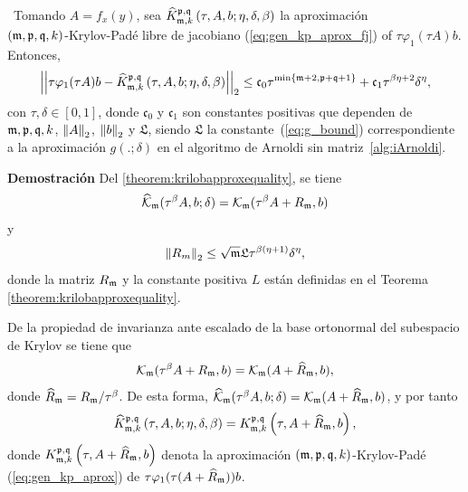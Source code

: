 \begin{theorem}\label{theorem:Krylov-fj-bound}
\cite{naranjo2023jacobian}~Tomando $A=f_x(y)$, sea $\widehat{K}_{\mathfrak{m},k}^{\mathfrak{p},\mathfrak{q}}\left(\tau, A , b ; \eta, \delta, \beta \right)$ la aproximación \\
	$(\mathfrak{m} , \mathfrak{p} ,\mathfrak{q} , k)$-Krylov-Padé libre de jacobiano (\ref{eq:gen_kp_aprox_fj}) of $\tau \varphi_1(\tau A)b$. Entonces,
	\begin{equation}
		\left\lvert\left\lvert  \tau \varphi_1(\tau A)b -
		\widehat{K}_{\mf,k}^{\pf,\qf}\left( \tau, A , b ; \eta, \delta, \beta \right)\right\rvert\right\rvert_2%
		\leq \mathfrak{c}_0 \tau^{\min\{\mf+2,\pf+\qf+1\}} + \mathfrak{c}_1 \tau^{\beta\eta+2}\delta^{\eta},
	\end{equation}
	con $\tau,\delta \in [0,1]$, donde $\mathfrak{c}_0$ y $\mathfrak{c}_1$ son constantes positivas que dependen de $\mathfrak{m},\mathfrak{p},\mathfrak{q},k$, $\left\lVert A \right\rVert_2$, $\left\lVert b \right\rVert_2$ y $\mathfrak{L}$, siendo $\mathfrak{L}$ la constante~(\ref{eq:g_bound}) correspondiente a la aproximación $g(.;\delta)$ en el algoritmo de Arnoldi sin matriz~\ref{alg:iArnoldi}.
\end{theorem}
\textbf{Demostración} Del \ref{theorem:krilobapproxequality}, se tiene
\[ \widehat{\mathcal{K}}_{\mathfrak{m}}(\tau^\beta A,b;\delta)=\mathcal{K}_{\mathfrak{m}}(\tau^\beta A+R_{\mathfrak{m}},b) \]
y
\begin{equation}
	\left\lVert R_m \right\rVert_2\leq \sqrt{\mathfrak{m}} \mathfrak{L} \tau^{\beta(\eta+1)}\delta^{\eta},  \label{eq:fjbound3}
\end{equation}
donde la matriz $R_{\mathfrak{m}}$ y la constante positiva $L$ están definidas en el Teorema \ref{theorem:krilobapproxequality}. 

De la propiedad de invarianza ante escalado de la base ortonormal del subespacio de Krylov se tiene que
\[ \mathcal{K}_{\mathfrak{m}}(\tau^\beta A+R_{\mathfrak{m}},b) = \mathcal{K}_{\mathfrak{m}}(A+\widehat{R}_{\mathfrak{m}},b), \]
donde $\widehat{R}_{\mathfrak{m}} = R_{\mathfrak{m}}/\tau^\beta$. De esta forma, $\widehat{\mathcal{K}}_{\mathfrak{m}}(\tau^\beta A,b;\delta)=\mathcal{K}_{\mathfrak{m}}(A+\widehat{R}_{\mathfrak{m}},b)$, y por tanto
\begin{equation}
	\widehat{K}_{\mathfrak{m},k}^{\mathfrak{p},\mathfrak{q}}\left( \tau, A , b; \eta, \delta, \beta \right) = K_{\mathfrak{m},k}^{\mathfrak{p},\mathfrak{q}}\left( \tau, A+\widehat{R}_{\mathfrak{m}} , b \right), \label{identidad}
\end{equation}
donde $K_{\mathfrak{m},k}^{\mathfrak{p},\mathfrak{q}}\left( \tau, A+\widehat{R}_{\mathfrak{m}} , b \right)$ denota la aproximación $(\mathfrak{m} , \mathfrak{p} ,\mathfrak{q} , k)$-Krylov-Padé (\ref{eq:gen_kp_aprox}) de $\tau \varphi_1(\tau (A+\widehat{R}_{\mathfrak{m}}))b$. 

